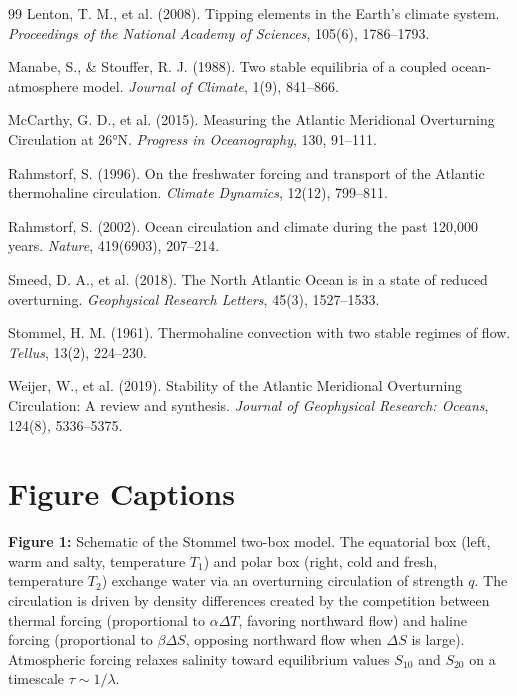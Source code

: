 \documentclass[12pt,letterpaper]{article}
\begin{document}
\begin{thebibliography}{99}
 Lenton, T. M., et al. (2008). Tipping elements in the Earth's climate system. \textit{Proceedings of the National Academy of Sciences}, 105(6), 1786--1793.

 Manabe, S., \& Stouffer, R. J. (1988). Two stable equilibria of a coupled ocean-atmosphere model. \textit{Journal of Climate}, 1(9), 841--866.

 McCarthy, G. D., et al. (2015). Measuring the Atlantic Meridional Overturning Circulation at 26°N. \textit{Progress in Oceanography}, 130, 91--111.

 Rahmstorf, S. (1996). On the freshwater forcing and transport of the Atlantic thermohaline circulation. \textit{Climate Dynamics}, 12(12), 799--811.

 Rahmstorf, S. (2002). Ocean circulation and climate during the past 120,000 years. \textit{Nature}, 419(6903), 207--214.

 Smeed, D. A., et al. (2018). The North Atlantic Ocean is in a state of reduced overturning. \textit{Geophysical Research Letters}, 45(3), 1527--1533.

 Stommel, H. M. (1961). Thermohaline convection with two stable regimes of flow. \textit{Tellus}, 13(2), 224--230.

 Weijer, W., et al. (2019). Stability of the Atlantic Meridional Overturning Circulation: A review and synthesis. \textit{Journal of Geophysical Research: Oceans}, 124(8), 5336--5375.

\end{thebibliography}

\newpage

\section*{Figure Captions}

\noindent \textbf{Figure 1:} Schematic of the Stommel two-box model. The equatorial box (left, warm and salty, temperature $T_1$) and polar box (right, cold and fresh, temperature $T_2$) exchange water via an overturning circulation of strength $q$. The circulation is driven by density differences created by the competition between thermal forcing (proportional to $\alpha \Delta T$, favoring northward flow) and haline forcing (proportional to $\beta \Delta S$, opposing northward flow when $\Delta S$ is large). Atmospheric forcing relaxes salinity toward equilibrium values $S_{10}$ and $S_{20}$ on a timescale $\tau \sim 1/\lambda$.
\end{document}

